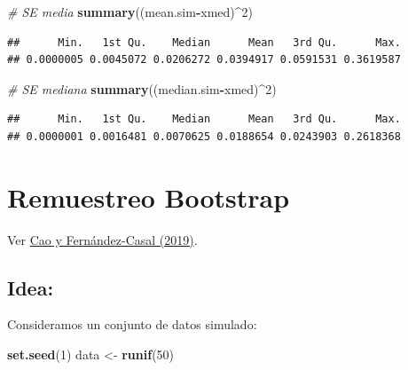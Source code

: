 \documentclass[
]{book}
\newenvironment{Shaded}{\begin{snugshade}}{\end{snugshade}}
\newcommand{\CommentTok}[1]{\textcolor[rgb]{0.56,0.35,0.01}{\textit{#1}}}
\newcommand{\DecValTok}[1]{\textcolor[rgb]{0.00,0.00,0.81}{#1}}
\newcommand{\KeywordTok}[1]{\textcolor[rgb]{0.13,0.29,0.53}{\textbf{#1}}}
\newcommand{\NormalTok}[1]{#1}
\newcommand{\OperatorTok}[1]{\textcolor[rgb]{0.81,0.36,0.00}{\textbf{#1}}}
\newcommand{\StringTok}[1]{\textcolor[rgb]{0.31,0.60,0.02}{#1}}
\theoremstyle{break}
\theoremstyle{definition}
\theoremstyle{definition}
\theoremstyle{definition}
\theoremstyle{remark}
\begin{document}
\begin{enumerate}
\begin{Shaded}
\begin{Highlighting}[]
\CommentTok{# SE media}
\KeywordTok{summary}\NormalTok{((mean.sim}\OperatorTok{-}\NormalTok{xmed)}\OperatorTok{^}\DecValTok{2}\NormalTok{) }
\end{Highlighting}
\end{Shaded}

\begin{verbatim}
##      Min.   1st Qu.    Median      Mean   3rd Qu.      Max. 
## 0.0000005 0.0045072 0.0206272 0.0394917 0.0591531 0.3619587
\end{verbatim}

\begin{Shaded}
\begin{Highlighting}[]
\CommentTok{# SE mediana}
\KeywordTok{summary}\NormalTok{((median.sim}\OperatorTok{-}\NormalTok{xmed)}\OperatorTok{^}\DecValTok{2}\NormalTok{) }
\end{Highlighting}
\end{Shaded}

\begin{verbatim}
##      Min.   1st Qu.    Median      Mean   3rd Qu.      Max. 
## 0.0000001 0.0016481 0.0070625 0.0188654 0.0243903 0.2618368
\end{verbatim}
\end{enumerate}

\hypertarget{remuestreo-bootstrap}{%
\section{Remuestreo Bootstrap}\label{remuestreo-bootstrap}}

Ver \href{https://rubenfcasal.github.io/book_remuestreo/}{Cao y Fernández-Casal (2019)}.

\hypertarget{idea}{%
\subsection{Idea:}\label{idea}}

Consideramos un conjunto de datos simulado:

\begin{Shaded}
\begin{Highlighting}[]
\KeywordTok{set.seed}\NormalTok{(}\DecValTok{1}\NormalTok{)}
\NormalTok{data <-}\StringTok{ }\KeywordTok{runif}\NormalTok{(}\DecValTok{50}\NormalTok{)}
\end{Highlighting}
\end{Shaded}
\end{document}

